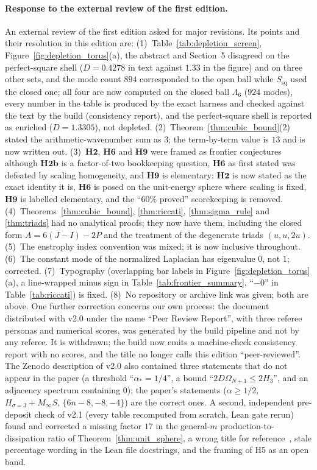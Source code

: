 \documentclass[11pt,a4paper]{article}
\theoremstyle{definition}
\theoremstyle{remark}
\begin{document}
\paragraph{Response to the external review of the first edition.}
An external review of the first edition asked for major revisions. Its points and their resolution in this edition are: (1)~Table~\ref{tab:depletion_screen}, Figure~\ref{fig:depletion_torus}(a), the abstract and Section~5 disagreed on the perfect-square shell ($D=0.4278$ in text against $1.33$ in the figure) and on three other sets, and the mode count $894$ corresponded to the open ball while $S_{\mathrm{sq}}$ used the closed one; all four are now computed on the closed ball $\Lambda_6$ ($924$ modes), every number in the table is produced by the exact harness and checked against the text by the build (consistency report), and the perfect-square shell is reported as enriched ($D=1.3305$), not depleted. (2)~Theorem~\ref{thm:cubic_bound}(2) stated the arithmetic-wavenumber sum as $3$; the term-by-term value is $13$ and is now written out. (3)~$\mathbf{H2}$, $\mathbf{H6}$ and $\mathbf{H9}$ were framed as frontier conjectures although $\mathbf{H2b}$ is a factor-of-two bookkeeping question, $\mathbf{H6}$ as first stated was defeated by scaling homogeneity, and $\mathbf{H9}$ is elementary: $\mathbf{H2}$ is now stated as the exact identity it is, $\mathbf{H6}$ is posed on the unit-energy sphere where scaling is fixed, $\mathbf{H9}$ is labelled elementary, and the ``$60\%$ proved'' scorekeeping is removed. (4)~Theorems~\ref{thm:cubic_bound}, \ref{thm:riccati}, \ref{thm:sigma_rule} and \ref{thm:triads} had no analytical proofs; they now have them, including the closed form $A=6(J-I)-2P$ and the treatment of the degenerate triads $(u,u,2u)$. (5)~The enstrophy index convention was mixed; it is now inclusive throughout. (6)~The constant mode of the normalized Laplacian has eigenvalue $0$, not $1$; corrected. (7)~Typography (overlapping bar labels in Figure~\ref{fig:depletion_torus}(a), a line-wrapped minus sign in Table~\ref{tab:frontier_summary}, ``$-0$'' in Table~\ref{tab:riccati}) is fixed. (8)~No repository or archive link was given; both are above. One further correction concerns our own process: the document distributed with v2.0 under the name ``Peer Review Report'', with three referee personas and numerical scores, was generated by the build pipeline and not by any referee. It is withdrawn; the build now emits a machine-check consistency report with no scores, and the title no longer calls this edition ``peer-reviewed''. The Zenodo description of v2.0 also contained three statements that do not appear in the paper (a threshold ``$\alpha_*=1/4$'', a bound ``$2D\Omega_{N+1}\le 2H_3$'', and an adjacency spectrum containing $0$); the paper's statements ($\alpha\ge 1/2$, $H_{\sigma=3}+M_\infty S$, $\{6n-8,-8,-4\}$) are the correct ones. A second, independent pre-deposit check of v2.1 (every table recomputed from scratch, Lean gate rerun) found and corrected a missing factor $17$ in the general-$m$ production-to-dissipation ratio of Theorem~\ref{thm:unit_sphere}, a wrong title for reference~\cite{BarbatoMorandinRomito2011}, stale percentage wording in the Lean file docstrings, and the framing of H5 as an open band.
\end{document}
